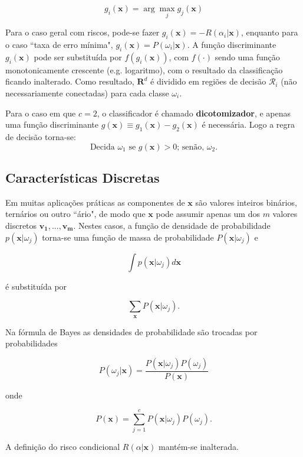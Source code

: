 \begin{equation}
    g_i(\boldsymbol{x}) = \arg\max_j g_j(\boldsymbol{x})
    \label{eq:discriminant_functions}
\end{equation}

Para o caso geral com riscos, pode-se fazer $g_i(\boldsymbol{x}) = - R(\alpha_i|\boldsymbol{x})$, enquanto para o caso ``taxa de erro mínima", $g_i(\boldsymbol{x}) = P(\omega_i|\boldsymbol{x})$. A função discriminante $g_i(\boldsymbol{x})$ pode ser substituída por $f(g_i(\boldsymbol{x}))$, com $f(\cdot)$ sendo uma função monotonicamente crescente (e.g. logaritmo), com o resultado da classificação ficando inalterado. Como resultado, $\boldsymbol{R}^d$ é dividido em regiões de decisão $\mathcal{R}_i$ (não necessariamente conectadas) para cada classe $\omega_i$.

Para o caso em que $c = 2$, o classificador é chamado \textbf{dicotomizador}, e apenas uma função discriminante $g(\boldsymbol{x}) \equiv g_1(\boldsymbol{x}) - g_2(\boldsymbol{x})$ é necessária. Logo a regra de decisão torna-se:
\begin{equation}
    \text{Decida } \omega_1 \text{ se } g(\boldsymbol{x}) > 0 \text {; senão, } \omega_2.
    \label{eq:decision_6}
\end{equation}

\subsection{Características Discretas}

Em muitas aplicações práticas as componentes de $\boldsymbol{x}$ são valores inteiros binários, ternários ou outro ``ário", de modo que $\boldsymbol{x}$ pode assumir apenas um dos $m$ valores discretos $\boldsymbol{v_1}, ..., \boldsymbol{v_m}$. Nestes casos, a função de densidade de probabilidade $p(\boldsymbol{x}|\omega_j)$ torna-se uma função de massa de probabilidade $P(\boldsymbol{x}|\omega_j)$ e

\begin{equation}
    \int p(\boldsymbol{x}|\omega_j) d\boldsymbol{x}
    \label{eq:integral_pdf}
\end{equation}

\noindent é substituída por

\begin{equation}
    \sum_{\boldsymbol{x}} P(\boldsymbol{x}|\omega_j).
    \label{eq:sum_pmf}
\end{equation}

\noindent Na fórmula de Bayes as densidades de probabilidade são trocadas por probabilidades

\begin{equation}
    P(\omega_j|\boldsymbol{x}) = \frac{P(\boldsymbol{x}|\omega_j)P(\omega_j)}{P(\boldsymbol{x})}
    \label{eq:bayes_discrete}
\end{equation}

onde

\begin{equation}
    P(\boldsymbol{x}) = \sum_{j=1}^c P(\boldsymbol{x}|\omega_j)P(\omega_j).
    \label{eq:bayes_discrete}
\end{equation}

A definição do risco condicional $R(\alpha|\boldsymbol{x})$ mantém-se inalterada.